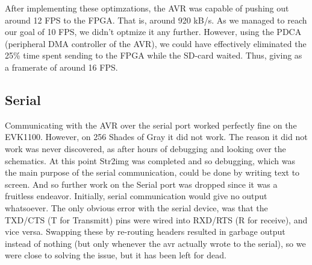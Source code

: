 After implementing these optimzations, the AVR was capable of pushing out around 12 FPS to the FPGA. That is, around 920 kB/s. As we managed to reach our goal of 10 FPS, we didn't optmize it any further. However, using the PDCA (peripheral DMA controller of the AVR), we could have effectively eliminated the 25\% time spent sending to the FPGA while the SD-card waited. Thus, giving as a framerate of around 16 FPS.

\subsection{Serial}
\label{sec:avr-serial-issues}
Communicating with the AVR over the serial port worked perfectly fine on the EVK1100. However, on 256
Shades of Gray it did not work. The reason it did not work was never discovered, as after hours of
debugging and looking over the schematics. At this point Str2img was completed and so debugging, which
was the main purpose of the serial communication, could be done by writing text to screen. And so
further work on the Serial port was dropped since it was a fruitless endeavor. Initially, serial
communication would give no output whatsoever. The only obvious error with the serial device, was that
the TXD/CTS (T for Transmitt) pins were wired into RXD/RTS (R for receive), and vice versa. Swapping
these by re-routing headers resulted in garbage output instead of nothing (but only whenever the avr
actually wrote to the serial), so we were close to solving the issue, but it has been left for dead.

